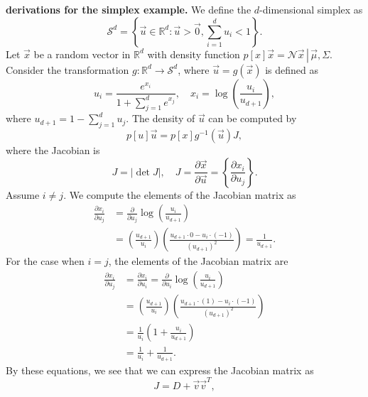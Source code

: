\documentclass[11pt]{article}
\newcommand{\pars}[1]{\left(#1\right)}
\newcommand{\reals}{\mathbb{R}}  %
\newcommand{\vect}[1]{\vec{#1}}  %
\newcommand{\setof}[1]{\left\{#1\right\}}  %
\newcommand{\st}{:}  %
\newcommand{\pdf}{p}  %
\newcommand{\normpdf}{\mathcal{N}}  %
\newcommand{\given}{\,\left.\right|\,}  %
\newcommand{\matr}[1]{#1}  %
\newcommand{\abs}[1]{\left|#1\right|}  %
\newcommand{\pdiff}[2]{\frac{\partial #1}{\partial #2}}  %
\newcommand{\tp}[1]{#1^T}  %
\begin{document}
\textbf{derivations for the simplex example.}
We define the $d$-dimensional simplex as
\begin{equation}
	\mathcal{S}^d = \setof{\vect{u} \in \reals^d \st \vect{u} > \vect{0}, \sum_{i=1}^d u_i < 1}.
\end{equation}
Let $\vect{x}$ be a random vector in $\reals^d$ with density function $\pdf[x]{\vect{x}} = \normpdf{\vect{x} \given \vect{\mu},\matr{\Sigma}}$.  Consider the transformation $g \st \reals^d \to \mathcal{S}^d$, where $\vect{u} = g(\vect{x})$ is defined as 
\begin{equation}
	u_i = \frac{e^{x_i}}{1 + \sum_{j=1}^{d} e^{x_j}}, \quad
		x_i = \log\pars{\frac{u_i}{u_{d+1}}},
\end{equation}
where $u_{d+1} = 1 - \sum_{j=1}^{d} u_j$.  The density of $\vect{u}$ can be computed by
\begin{equation} \label{eq:DensityTransformation}
	\pdf[u]{\vect{u}} = \pdf[x]{g^{-1}\pars{\vect{u}}} J,
\end{equation}
where the Jacobian is
\begin{equation}
	J = \abs{\det{\matr{J}}}, \quad \matr{J} = \pdiff{\vect{x}}{\vect{u}} = \setof{\pdiff{x_i}{u_j}}.
\end{equation}
Assume $i \neq j$.  We compute the elements of the Jacobian matrix as
\begin{equation}
	\begin{split}
		\pdiff{x_i}{u_j} & = \pdiff{}{u_j} \log\pars{\frac{u_i}{u_{d+1}}} \\
		& = \pars{\frac{u_{d+1}}{u_i}} \pars{\frac{u_{d+1}\cdot 0 - u_i \cdot(-1)}{\pars{u_{d+1}}^2}}
			= \frac{1}{u_{d+1}}.
	\end{split}
\end{equation}
For the case when $i = j$, the elements of the Jacobian matrix are
\begin{equation}
	\begin{split}
		\pdiff{x_i}{u_j} & = \pdiff{x_i}{u_i} = \pdiff{}{u_i} \log\pars{\frac{u_i}{u_{d+1}}} \\
		& = \pars{\frac{u_{d+1}}{u_i}} \pars{\frac{u_{d+1}\cdot(1) - u_i \cdot(-1)}{\pars{u_{d+1}}^2}} \\
		& = \frac{1}{u_i}\pars{1 + \frac{u_i}{u_{d+1}}} \\
		& = \frac{1}{u_i} + \frac{1}{u_{d+1}}.
	\end{split}
\end{equation}
By these equations, we see that we can express the Jacobian matrix as
\begin{equation}
	\matr{J} = \matr{D} + \vect{v}\tp{\vect{v}},
\end{equation}
\end{document}

